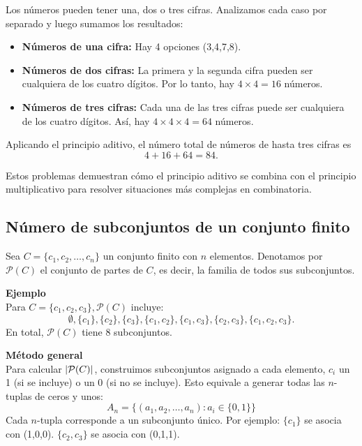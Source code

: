 \documentclass[12pt,a4paper]{book}
\begin{document}
    \begin{solucion}
        Los números pueden tener una, dos o tres cifras. Analizamos cada caso por separado y luego sumamos los resultados:
        \begin{itemize}
            \item \textbf{Números de una cifra:} Hay 4 opciones (3,4,7,8).
            \item \textbf{Números de dos cifras:} La primera y la segunda cifra pueden ser cualquiera de los cuatro dígitos. Por lo tanto, hay $4\times4=16$ números.
            \item \textbf{Números de tres cifras:} Cada una de las tres cifras puede ser cualquiera de los cuatro dígitos. Así, hay $4\times4\times4=64$ números.
        \end{itemize}
        Aplicando el principio aditivo, el número total de números de hasta tres cifras es
        \begin{equation*}
            4+16+64=84.
        \end{equation*}
    \end{solucion}

    Estos problemas demuestran cómo el principio aditivo se combina con el principio multiplicativo para resolver situaciones más complejas en combinatoria.

    \subsection{Número de subconjuntos de un conjunto finito}

    Sea $C=\{c_{1},c_{2},\dots,c_{n}\}$ un conjunto finito con $n$ elementos. Denotamos por
    $\mathcal{P}(C)$ el conjunto de partes de $C$, es decir, la familia de todos sus subconjuntos.

    \textbf{Ejemplo}\\
    Para $C=\{c_{1},c_{2},c_{3}\},\mathcal{P}(C)$ incluye:
    \begin{equation*}
        \emptyset,\{c_{1}\},\{c_{2}\},\{c_{3}\},\{c_{1},c_{2}\},\{c_{1},c_{3}\},\{c_{2},c_{3}\},\{c_{1},c_{2},c_{3}\}.
    \end{equation*}
    En total, $\mathcal{P}(C)$ tiene 8 subconjuntos.

    \textbf{Método general}\\
    Para calcular $\abs{\mathcal{P}(C)}$, construimos subconjuntos asignado a cada elemento,
    $c_{i}$ un 1 (si se incluye) o un 0 (si no se incluye). Esto equivale a generar todas las $n$-tuplas de ceros y unos:
    \begin{equation*}
        A_{n}=\{(a_{1},a_{2},\dots,a_{n}):a_{i}\in\{0,1\}\}
    \end{equation*}
    Cada $n$-tupla corresponde a un subconjunto único. Por ejemplo: $\{c_{1}\}$ se asocia con (1,0,0). $\{c_{2},c_{3}\}$ se asocia con (0,1,1).
\end{document}
